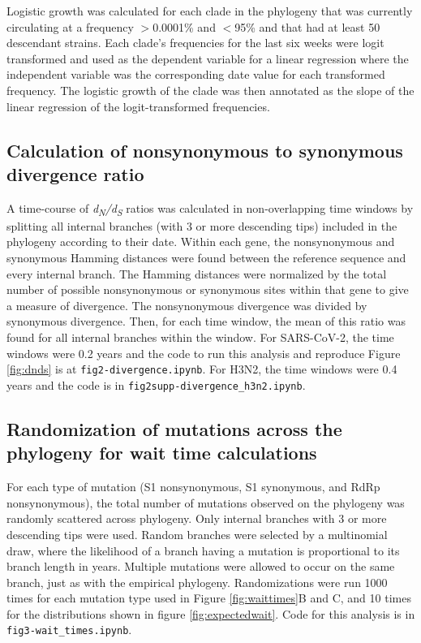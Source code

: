\documentclass[11pt,oneside,letterpaper]{article}
\begin{document}
Logistic growth was calculated for each clade in the phylogeny that was currently circulating at a frequency $>$0.0001\% and $<$95\% and that had at least 50 descendant strains. 
Each clade’s frequencies for the last six weeks were logit transformed and used as the dependent variable for a linear regression where the independent variable was the corresponding date value for each transformed frequency. 
The logistic growth of the clade was then annotated as the slope of the linear regression of the logit-transformed frequencies.

\subsection*{Calculation of nonsynonymous to synonymous divergence ratio}
A time-course of \emph{d\textsubscript{N}/d\textsubscript{S}} ratios was calculated in non-overlapping time windows by splitting all internal branches (with 3 or more descending tips) included in the phylogeny according to their date. 
Within each gene, the nonsynonymous and synonymous Hamming distances were found between the reference sequence and every internal branch. 
The Hamming distances were normalized by the total number of possible nonsynonymous or synonymous sites within that gene to give a measure of divergence. 
The nonsynonymous divergence was divided by synonymous divergence. Then, for each time window, the mean of this ratio was found for all internal branches within the window. 
For SARS-CoV-2, the time windows were 0.2 years and the code to run this analysis and reproduce Figure \ref{fig:dnds} is at \texttt{fig2-divergence.ipynb}. 
For H3N2, the time windows were 0.4 years and the code is in \texttt{fig2supp-divergence\_h3n2.ipynb}.

\subsection*{Randomization of mutations across the phylogeny for wait time calculations}
For each type of mutation (S1 nonsynonymous, S1 synonymous, and RdRp nonsynonymous), the total number of mutations observed on the phylogeny was randomly scattered across phylogeny. 
Only internal branches with 3 or more descending tips were used. 
Random branches were selected by a multinomial draw, where the likelihood of a branch having a mutation is proportional to its branch length in years. 
Multiple mutations were allowed to occur on the same branch, just as with the empirical phylogeny. 
Randomizations were run 1000 times for each mutation type used in Figure \ref{fig:waittimes}B and C, and 10 times for the distributions shown in figure \ref{fig:expectedwait}. Code for this analysis is in \texttt{fig3-wait\_times.ipynb}.
\end{document}
